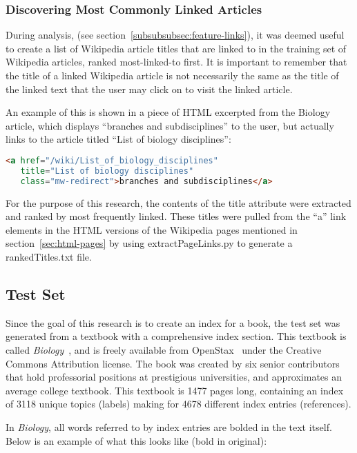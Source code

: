 \subsubsection{Discovering Most Commonly Linked Articles}
\label{sec:ranked-titles}

During analysis, (see section~\ref{subsubsubsec:feature-links}), it was deemed useful to create a list of Wikipedia article titles that are linked to in the training set of Wikipedia articles, ranked most-linked-to first.
It is important to remember that the title of a linked Wikipedia article is not necessarily the same as the title of the linked text that the user may click on to visit the linked article.

An example of this is shown in a piece of HTML excerpted from the Biology article, which displays ``branches and subdisciplines'' to the user, but actually links to the article titled ``List of biology disciplines'':
\begin{lstlisting}[language=HTML]
<a href="/wiki/List_of_biology_disciplines"
   title="List of biology disciplines"
   class="mw-redirect">branches and subdisciplines</a>
\end{lstlisting}
\noindent For the purpose of this research, the contents of the title attribute were extracted and ranked by most frequently linked.
These titles were pulled from the ``a'' link elements in the HTML versions of the Wikipedia pages mentioned in section~\ref{sec:html-pages} by using extractPageLinks.py to generate a rankedTitles.txt file.

\subsection{Test Set}
\label{subsec:test-set}

Since the goal of this research is to create an index for a book, the test set was generated from a textbook with a comprehensive index section.
This textbook is called {\it Biology}~\cite{biology}, and is freely available from OpenStax~\cite{openstax-bio} under the Creative Commons Attribution license.
The book was created by six senior contributors that hold professorial positions at prestigious universities, and approximates an average college textbook.
This textbook is 1477 pages long, containing an index of 3118 unique topics (labels) making for 4678 different index entries (references).

In {\it Biology}, all words referred to by index entries are bolded in the text itself. Below is an example of what this looks like (bold in original):

